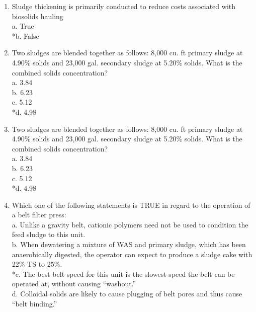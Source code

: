 \documentclass{article}
\begin{document}
\begin{enumerate}
\item  Sludge thickening is primarily conducted to reduce costs associated with biosolids hauling \\

a. True \\
*b. False \\

\item  Two sludges are blended together as follows: 8,000 cu. ft primary sludge at 4.90\% solids and 23,000 gal. secondary sludge at 5.20\% solids. What is the combined solids concentration?\\


a. 3.84 \\
b. 6.23 \\
c. 5.12 \\
*d. 4.98 \\

\item  Two sludges are blended together as follows: 8,000 cu. ft primary sludge at 4.90\% solids and 23,000 gal. secondary sludge at 5.20\% solids. What is the combined solids concentration?\\


a. 3.84 \\
b. 6.23 \\
c. 5.12 \\
*d. 4.98 \\

\item  Which one of the following statements is TRUE in regard to the operation of a belt filter press: \\

a. Unlike a gravity belt, cationic polymers need not be used to condition the feed sludge to this unit. \\
b. When dewatering a mixture of WAS and primary sludge, which has been anaerobically digested, the operator can expect to produce a sludge cake with 22\% TS to 25\%. \\
*c. The best belt speed for this unit is the slowest speed the belt can be operated at, without causing “washout.” \\
d. Colloidal solids are likely to cause plugging of belt pores and thus cause “belt binding.” \\


\end{enumerate}
\end{document}
